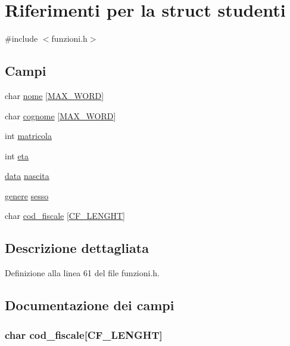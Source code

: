 \hypertarget{structstudenti}{\section{Riferimenti per la struct studenti}
\label{structstudenti}
}


{\ttfamily \#include $<$funzioni.\+h$>$}

\subsection*{Campi}
\begin{DoxyCompactItemize}
\item 
char \hyperlink{structstudenti_aa20591db231b0ea83a7daaf108ed56d6}{nome} \mbox{[}\hyperlink{funzioni_8h_a95b015e2f596dc86ea9220be04427e1a}{M\+A\+X\+\_\+\+W\+O\+R\+D}\mbox{]}
\item 
char \hyperlink{structstudenti_aec37540b0d415c235eeb1d05240691df}{cognome} \mbox{[}\hyperlink{funzioni_8h_a95b015e2f596dc86ea9220be04427e1a}{M\+A\+X\+\_\+\+W\+O\+R\+D}\mbox{]}
\item 
int \hyperlink{structstudenti_af8100806d9eccdb8c237e5b414d59ce9}{matricola}
\item 
int \hyperlink{structstudenti_a1ec09f1a0f2b61e496bd8d0f9416b75e}{eta}
\item 
\hyperlink{structdata}{data} \hyperlink{structstudenti_a30ffef5fcbdae0613ebea58e0a34f866}{nascita}
\item 
\hyperlink{funzioni_8h_ae0d92465be0a5da3dee5aa7bef3309fc}{genere} \hyperlink{structstudenti_a66c70a3a36fe5a277a901c6ecce3383d}{sesso}
\item 
char \hyperlink{structstudenti_a5253f7c757a4b2e7caf03abf9dc8bc15}{cod\+\_\+fiscale} \mbox{[}\hyperlink{funzioni_8h_aabc33985f13b39c5520ade1044cadfa6}{C\+F\+\_\+\+L\+E\+N\+G\+H\+T}\mbox{]}
\end{DoxyCompactItemize}


\subsection{Descrizione dettagliata}


Definizione alla linea 61 del file funzioni.\+h.



\subsection{Documentazione dei campi}
\hypertarget{structstudenti_a5253f7c757a4b2e7caf03abf9dc8bc15}{
\subsubsection[{cod\+\_\+fiscale}]{\setlength{\rightskip}{0pt plus 5cm}char cod\+\_\+fiscale\mbox{[}{\bf C\+F\+\_\+\+L\+E\+N\+G\+H\+T}\mbox{]}}}\label{structstudenti_a5253f7c757a4b2e7caf03abf9dc8bc15}


